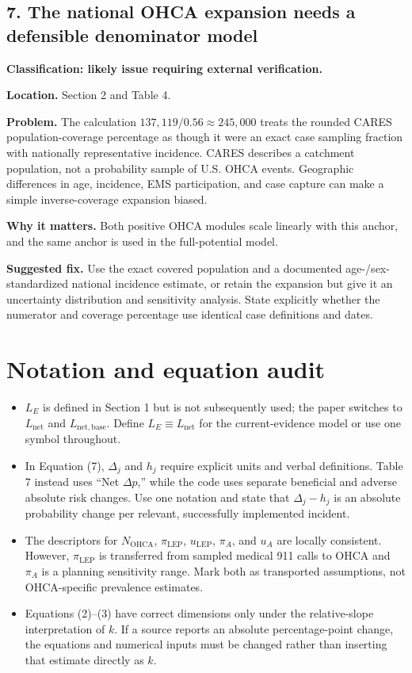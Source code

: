 \documentclass[11pt]{article}
\begin{document}
\subsection*{7. The national OHCA expansion needs a defensible denominator model}

\textbf{Classification: likely issue requiring external verification.}

\textbf{Location.} Section 2 and Table 4.

\textbf{Problem.} The calculation $137{,}119/0.56\approx245{,}000$ treats the
rounded CARES population-coverage percentage as though it were an exact case
sampling fraction with nationally representative incidence.  CARES describes a
catchment population, not a probability sample of U.S. OHCA events.  Geographic
differences in age, incidence, EMS participation, and case capture can make a
simple inverse-coverage expansion biased.

\textbf{Why it matters.} Both positive OHCA modules scale linearly with this
anchor, and the same anchor is used in the full-potential model.

\textbf{Suggested fix.} Use the exact covered population and a documented
age-/sex-standardized national incidence estimate, or retain the expansion but
give it an uncertainty distribution and sensitivity analysis.  State explicitly
whether the numerator and coverage percentage use identical case definitions
and dates.

\section*{Notation and equation audit}

\begin{itemize}
\item $L_E$ is defined in Section 1 but is not subsequently used; the paper
switches to $L_{\mathrm{net}}$ and $L_{\mathrm{net,base}}$.  Define
$L_E\equiv L_{\mathrm{net}}$ for the current-evidence model or use one symbol
throughout.
\item In Equation (7), $\Delta_j$ and $h_j$ require explicit units and verbal
definitions.  Table 7 instead uses ``Net $\Delta p$,'' while the code uses
separate beneficial and adverse absolute risk changes.  Use one notation and
state that $\Delta_j-h_j$ is an absolute probability change per relevant,
successfully implemented incident.
\item The descriptors for $N_{\mathrm{OHCA}}$, $\pi_{\mathrm{LEP}}$,
$u_{\mathrm{LEP}}$, $\pi_A$, and $u_A$ are locally consistent.  However,
$\pi_{\mathrm{LEP}}$ is transferred from sampled medical 911 calls to OHCA and
$\pi_A$ is a planning sensitivity range.  Mark both as transported assumptions,
not OHCA-specific prevalence estimates.
\item Equations (2)--(3) have correct dimensions only under the relative-slope
interpretation of $k$.  If a source reports an absolute percentage-point change,
the equations and numerical inputs must be changed rather than inserting that
estimate directly as $k$.
\end{itemize}
\end{document}
